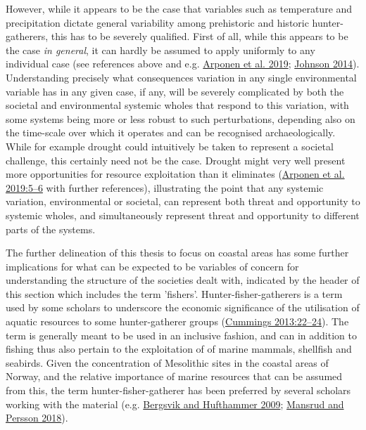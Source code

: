 \documentclass[
  12pt,
  a4paper,
  oneside]{book}
\begin{document}
However, while it appears to be the case that variables such as temperature and precipitation dictate general variability among prehistoric and historic hunter-gatherers, this has to be severely qualified. First of all, while this appears to be the case \emph{in general}, it can hardly be assumed to apply uniformly to any individual case (see references above and e.g. \protect\hyperlink{ref-arponen2019}{Arponen et al. 2019}; \protect\hyperlink{ref-johnson2014}{Johnson 2014}). Understanding precisely what consequences variation in any single environmental variable has in any given case, if any, will be severely complicated by both the societal and environmental systemic wholes that respond to this variation, with some systems being more or less robust to such perturbations, depending also on the time-scale over which it operates and can be recognised archaeologically. While for example drought could intuitively be taken to represent a societal challenge, this certainly need not be the case. Drought might very well present more opportunities for resource exploitation than it eliminates (\protect\hyperlink{ref-arponen2019}{Arponen et al. 2019:5--6} with further references), illustrating the point that any systemic variation, environmental or societal, can represent both threat and opportunity to systemic wholes, and simultaneously represent threat and opportunity to different parts of the systems.

The further delineation of this thesis to focus on coastal areas has some further implications for what can be expected to be variables of concern for understanding the structure of the societies dealt with, indicated by the header of this section which includes the term 'fishers'. Hunter-fisher-gatherers
is a term used by some scholars to underscore the economic significance of the utilisation of aquatic resources to some hunter-gatherer groups (\protect\hyperlink{ref-cummings2013}{Cummings 2013:22--24}). The term is generally meant to be used in an inclusive fashion, and can in addition to fishing thus also pertain to the exploitation of of marine mammals, shellfish and seabirds. Given the concentration of Mesolithic sites in the coastal areas of Norway, and the relative importance of marine resources that can be assumed from this, the term hunter-fisher-gatherer has been preferred by several scholars working with the material (e.g. \protect\hyperlink{ref-bergsvik2009b}{Bergsvik and Hufthammer 2009}; \protect\hyperlink{ref-mansrud2018}{Mansrud and Persson 2018}).
\end{document}
